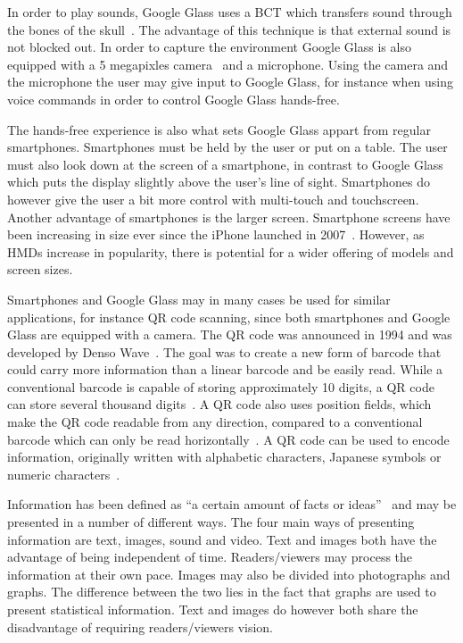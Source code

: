 In order to play sounds, Google Glass uses a BCT which transfers sound through the bones of the skull~\cite{GlassSpecs}. The advantage of this technique is that external sound is not blocked out. In order to capture the environment Google Glass is also equipped with a 5 megapixles camera~\cite{GlassSpecs} and a microphone. Using the camera and the microphone the user may give input to Google Glass, for instance when using voice commands in order to control Google Glass hands-free.

The hands-free experience is also what sets Google Glass appart from regular smartphones. Smartphones must be held by the user or put on a table. The user must also look down at the screen of a smartphone, in contrast to Google Glass which puts the display slightly above the user's line of sight. Smartphones do however give the user a bit more control with multi-touch and touchscreen. Another advantage of smartphones is the larger screen. Smartphone screens have been increasing in size ever since the iPhone launched in 2007~\cite{smartphoneSizeChart2}. However, as HMDs increase in popularity, there is potential for a wider offering of models and screen sizes.

Smartphones and Google Glass may in many cases be used for similar applications, for instance QR code scanning, since both smartphones and Google Glass are equipped with a camera. The QR code was announced in 1994 and was developed by Denso Wave~\cite{qrCodeHistory}. The goal was to create a new form of barcode that could carry more information than a linear barcode and be easily read. While a conventional barcode is capable of storing approximately 10 digits, a QR code can store several thousand digits~\cite{qrCodeType}. A QR code also uses position fields, which make the QR code readable from any direction, compared to a conventional barcode which can only be read horizontally~\cite{qrCodeAbout}. A QR code can be used to encode information, originally written with alphabetic characters, Japanese symbols or numeric characters~\cite{qrCodeVersion}. 

Information has been defined as ``a certain amount of facts or ideas''~\cite{informationDef1} and may be presented in a number of different ways. The four main ways of presenting information are text, images, sound and video. Text and images both have the advantage of being independent of time. Readers/viewers may process the information at their own pace. Images may also be divided into photographs and graphs. The difference between the two lies in the fact that graphs are used to present statistical information. Text and images do however both share the disadvantage of requiring readers/viewers vision.

